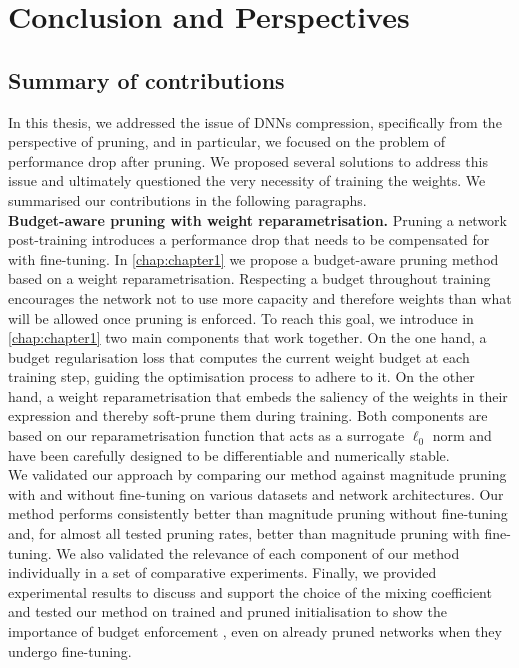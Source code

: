 \chapter{Conclusion and Perspectives}

\section{Summary of contributions}

In this thesis, we addressed the issue of \aclp{DNN} compression, specifically
from the perspective of pruning, and in particular, we focused on the problem of
performance drop after pruning. We proposed several solutions to address this
issue and ultimately questioned the very necessity of training the weights. We
summarised our contributions in the following paragraphs.\\

\noindent \textbf{Budget-aware pruning with weight reparametrisation.} Pruning a
network post-training introduces a performance drop that needs to be compensated
for with fine-tuning. In \cref{chap:chapter1} we propose a budget-aware pruning
method based on a weight reparametrisation. Respecting a budget throughout
training \DIFaddbegin {}\DIFaddend encourages the network not to use more capacity and therefore weights than what
will be allowed once pruning is enforced.  To reach this goal, we introduce in
\cref{chap:chapter1} two main components that work together. On the one hand, a
budget regularisation loss that computes the current weight budget at each
training step, guiding the optimisation process to adhere to it. On the other
hand, a weight reparametrisation that embeds the saliency of the weights in
their expression and thereby soft-prune them during training. Both components
are based on our reparametrisation function that acts as a surrogate $\ell_0$
norm and have been carefully designed to be differentiable and numerically
stable.\\

We validated our approach by comparing our method against magnitude pruning with
and without fine-tuning on various datasets and network architectures. Our
method performs consistently better than magnitude pruning without fine-tuning
and, for almost all tested pruning rates, better than magnitude pruning with
fine-tuning. We also validated the relevance of each component of our method
individually in a set of comparative experiments. Finally, we provided
experimental results to discuss and support the choice of the mixing coefficient
\DIFdelbegin \DIFdel{$\lambda$ }\DIFdelend and tested our method on trained and pruned initialisation to show the
importance of budget enforcement \DIFaddbegin {}\DIFaddend , even on already
pruned networks when they undergo fine-tuning.\\

